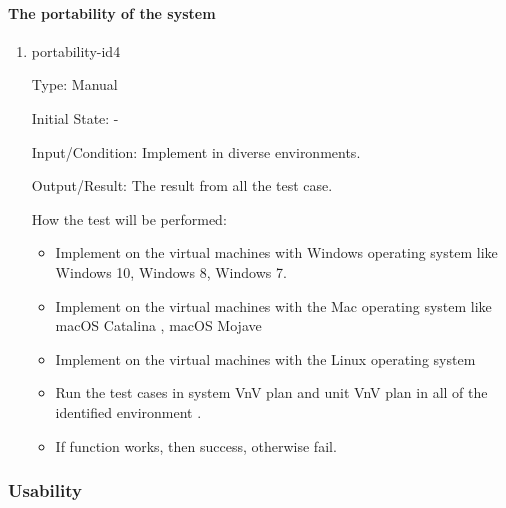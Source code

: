\documentclass[12pt, titlepage]{article}
\begin{document}
\paragraph{The portability of the system}
\begin{enumerate}

\item{portability-id4\\}

Type: Manual
					
Initial State: -
					
Input/Condition: Implement \progname in diverse environments.
					
Output/Result: The result from all the test case.
					

How the test will be performed:
\begin{itemize}
\item Implement \progname on the
virtual machines with Windows operating system like Windows 10, Windows 8, Windows 7.
\item Implement \progname on the
virtual machines with the Mac operating system like macOS Catalina , macOS Mojave

\item Implement \progname on the
virtual machines with the Linux operating system
\item Run the test cases in system VnV plan and unit VnV plan in all of the identified environment
.
\item If function works, then success, otherwise fail.
\end{itemize}

\end{enumerate}



\subsubsection{Usability} 
\end{document}
